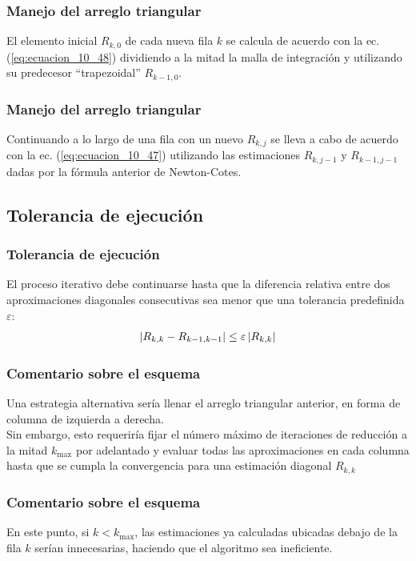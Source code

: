 \begin{frame}
\frametitle{Manejo del arreglo triangular}
El elemento inicial $R_{k, 0}$ de cada nueva fila $k$ se calcula de acuerdo con la ec. (\ref{eq:ecuacion_10_48}) dividiendo a la mitad la malla de integración y utilizando su predecesor \enquote{trapezoidal} $R_{k-1, 0}$.
\end{frame}
\begin{frame}
\frametitle{Manejo del arreglo triangular}
Continuando a lo largo de una fila con un nuevo $R_{k, j}$ se lleva a cabo de acuerdo con la ec. (\ref{eq:ecuacion_10_47}) utilizando las estimaciones $R_{k, j-1}$ y $R_{k-1, j-1}$ dadas por la fórmula anterior de Newton-Cotes.
\end{frame}
\subsection*{Tolerancia de ejecución}
\begin{frame}
\frametitle{Tolerancia de ejecución}
El proceso iterativo debe continuarse hasta que la diferencia relativa entre dos aproximaciones diagonales consecutivas sea menor que una tolerancia predefinida $\varepsilon$:
\begin{align*}
\abs{R_{k, k} - R_{k-1, k-1}} \leq \varepsilon \, \abs{R_{k, k}}
\end{align*}
\end{frame}
\begin{frame}
\frametitle{Comentario sobre el esquema}
Una estrategia alternativa sería llenar el arreglo triangular anterior, en forma de columna de izquierda a derecha.
\\
\bigskip
Sin embargo, esto requeriría fijar el número máximo de iteraciones de reducción a la mitad $k_{\max}$ por adelantado y evaluar todas las aproximaciones en cada columna hasta que se cumpla la convergencia para una estimación diagonal $R_{k, k}$
\end{frame}
\begin{frame}
\frametitle{Comentario sobre el esquema}
En este punto, si $k < k_{\max}$, las estimaciones ya calculadas ubicadas debajo de la fila $k$ serían innecesarias, haciendo que el algoritmo sea ineficiente.
\end{frame}
